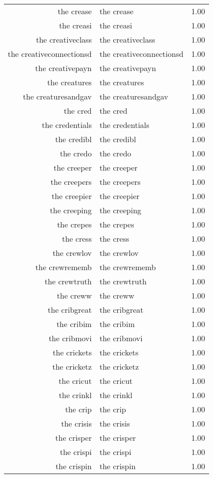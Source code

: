 \begin{table}[ht]
\begin{tabular}{rlr}
  the crease & the crease & 1.00 \\ 
  the creasi & the creasi & 1.00 \\ 
  the creativeclass & the creativeclass & 1.00 \\ 
  the creativeconnectionsd & the creativeconnectionsd & 1.00 \\ 
  the creativepayn & the creativepayn & 1.00 \\ 
  the creatures & the creatures & 1.00 \\ 
  the creaturesandgav & the creaturesandgav & 1.00 \\ 
  the cred & the cred & 1.00 \\ 
  the credentials & the credentials & 1.00 \\ 
  the credibl & the credibl & 1.00 \\ 
  the credo & the credo & 1.00 \\ 
  the creeper & the creeper & 1.00 \\ 
  the creepers & the creepers & 1.00 \\ 
  the creepier & the creepier & 1.00 \\ 
  the creeping & the creeping & 1.00 \\ 
  the crepes & the crepes & 1.00 \\ 
  the cress & the cress & 1.00 \\ 
  the crewlov & the crewlov & 1.00 \\ 
  the crewrememb & the crewrememb & 1.00 \\ 
  the crewtruth & the crewtruth & 1.00 \\ 
  the creww & the creww & 1.00 \\ 
  the cribgreat & the cribgreat & 1.00 \\ 
  the cribim & the cribim & 1.00 \\ 
  the cribmovi & the cribmovi & 1.00 \\ 
  the crickets & the crickets & 1.00 \\ 
  the cricketz & the cricketz & 1.00 \\ 
  the cricut & the cricut & 1.00 \\ 
  the crinkl & the crinkl & 1.00 \\ 
  the crip & the crip & 1.00 \\ 
  the crisis & the crisis & 1.00 \\ 
  the crisper & the crisper & 1.00 \\ 
  the crispi & the crispi & 1.00 \\ 
  the crispin & the crispin & 1.00 \\ 

\end{tabular}
\end{table}

